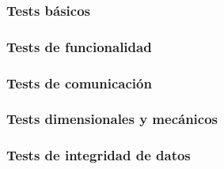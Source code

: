 \documentclass[../../../main.tex]{subfiles}
\begin{document}
\subsubsection{Tests básicos}\label{subsubsec:basicos}


\subsubsection{Tests de funcionalidad}\label{subsubsec:funcionalidad}


\subsubsection{Tests de comunicación}\label{subsubsec:comunicacion}


\subsubsection{Tests dimensionales y mecánicos}\label{subsubsec:dimenmeca}


\subsubsection{Tests de integridad de datos}\label{subsubsec:integridad}

\end{document}

